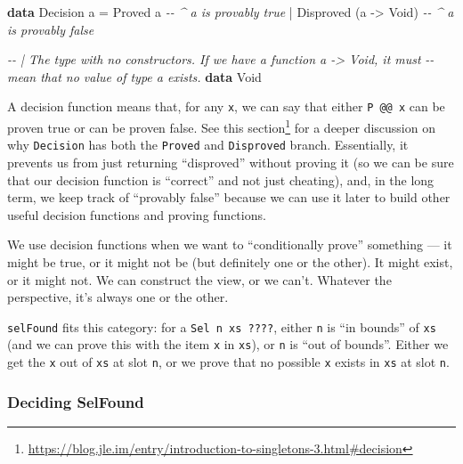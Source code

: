 \documentclass[]{article}
\newenvironment{Shaded}{}{}
\newcommand{\CommentTok}[1]{\textcolor[rgb]{0.38,0.63,0.69}{\textit{#1}}}
\newcommand{\DataTypeTok}[1]{\textcolor[rgb]{0.56,0.13,0.00}{#1}}
\newcommand{\KeywordTok}[1]{\textcolor[rgb]{0.00,0.44,0.13}{\textbf{#1}}}
\newcommand{\NormalTok}[1]{#1}
\newcommand{\OperatorTok}[1]{\textcolor[rgb]{0.40,0.40,0.40}{#1}}
\newcommand{\OtherTok}[1]{\textcolor[rgb]{0.00,0.44,0.13}{#1}}
\renewcommand{\href}[2]{#2\footnote{\url{#1}}}
\begin{document}
\begin{Shaded}
\begin{Highlighting}[]
\KeywordTok{data} \DataTypeTok{Decision}\NormalTok{ a}
    \OtherTok{=} \DataTypeTok{Proved}\NormalTok{     a                }\CommentTok{{-}{-} \^{} \textasciigrave{}a\textasciigrave{} is provably true}
    \OperatorTok{|} \DataTypeTok{Disproved}\NormalTok{ (a }\OtherTok{{-}>} \DataTypeTok{Void}\NormalTok{)       }\CommentTok{{-}{-} \^{} \textasciigrave{}a\textasciigrave{} is provably false}

\CommentTok{{-}{-} | The type with no constructors.  If we have a function \textasciigrave{}a {-}> Void\textasciigrave{}, it must}
\CommentTok{{-}{-} mean that no value of type \textasciigrave{}a\textasciigrave{} exists.}
\KeywordTok{data} \DataTypeTok{Void}
\end{Highlighting}
\end{Shaded}

A decision function means that, for any \texttt{x}, we can say that either
\texttt{P\ @@\ x} can be proven true or can be proven false. See
\href{https://blog.jle.im/entry/introduction-to-singletons-3.html\#decision}{this
section} for a deeper discussion on why \texttt{Decision} has both the
\texttt{Proved} and \texttt{Disproved} branch. Essentially, it prevents us from
just returning ``disproved'' without proving it (so we can be sure that our
decision function is ``correct'' and not just cheating), and, in the long term,
we keep track of ``provably false'' because we can use it later to build other
useful decision functions and proving functions.

We use decision functions when we want to ``conditionally prove'' something ---
it might be true, or it might not be (but definitely one or the other). It might
exist, or it might not. We can construct the view, or we can't. Whatever the
perspective, it's always one or the other.

\texttt{selFound} fits this category: for a \texttt{Sel\ n\ xs\ ????}, either
\texttt{n} is ``in bounds'' of \texttt{xs} (and we can prove this with the item
\texttt{x} in \texttt{xs}), or \texttt{n} is ``out of bounds''. Either we get
the \texttt{x} out of \texttt{xs} at slot \texttt{n}, or we prove that no
possible \texttt{x} exists in \texttt{xs} at slot \texttt{n}.

\hypertarget{deciding-selfound}{%
\subsubsection{Deciding SelFound}\label{deciding-selfound}}
\end{document}
